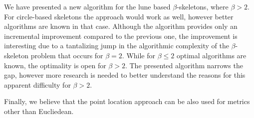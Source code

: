 \documentclass[10pt]{article}
\begin{document}
We have presented a new algorithm for the lune based $\beta$-skeletons, where $\beta > 2$. For circle-based skeletons the approach would work as well, 
however better algorithms are known in that case.
Although the algorithm provides only an incremental improvement
compared to the previous one, the improvement is interesting due to
a tantalizing jump in the algorithmic complexity of the $\beta$-skeleton problem
that occurs for $\beta = 2$. While for $\beta \leq 2$ optimal
algorithms are known,  the optimality is open for $\beta > 2$.
The presented algorithm narrows the gap, however more research is needed to
better understand the reasons for this apparent difficulty for $\beta > 2$.

Finally, we believe that the point location approach can be also used for
metrics other than Eucliedean. 





\small 

\end{document}

